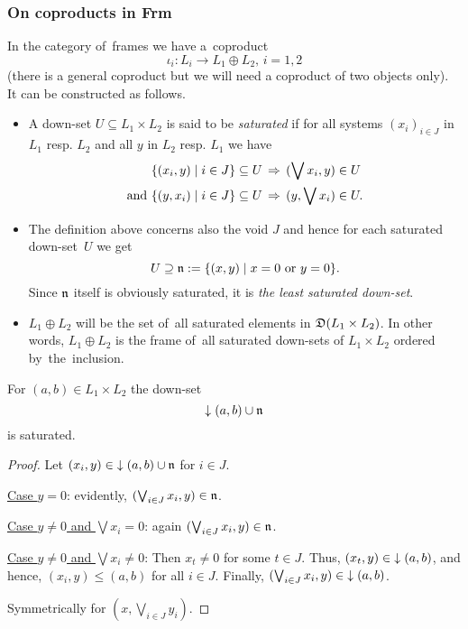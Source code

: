 \subsubsection*{On coproducts in Frm}

In the category of~frames we have a~coproduct
\[
  \iota_i: L_i \to L_1 \oplus L_2, \, i = 1, 2
\]
(there is a general coproduct but we will need a coproduct of two objects
 only).
It can be constructed as follows.

\begin{itemize}
\item
{} \label{df:satur}
A down-set $U\subseteq L_1 \times L_2$ is said to be \emph{saturated\/} if for
all systems $(x_i)_{i\in J}$ in $L_1$ resp. $L_2$ and all $y$ in $L_2$ resp.
$L_1$ we have
\begin{align*}
    \{ (x_i, y) \mid i\in J \} \subseteq U \, &\Rightarrow \, (\bigvee x_i,
        y)\in U \\
    \text{and } \{ (y, x_i) \mid i\in J \} \subseteq U \, &\Rightarrow \, (y,
        \bigvee x_i)\in U.
  \end{align*}

\item The definition above concerns also the void $J$ and hence for each
saturated down-set~$U$ we get
\[
  U\supseteq \mathfrak{n} := \{ (x, y) \mid x = 0 \text{ or } y = 0 \}.
\]
Since $\mathfrak{n}$ itself is obviously saturated, it is \emph{the least saturated
down-set\/}.

\item $L_1 \oplus L_2$ will be the set of~all saturated elements in $\mathfrak{D}(L_1
\times L_2)$.
In other words, $L_1 \oplus L_2$ is the frame of~all saturated down-sets of
$L_1 \times L_2$ ordered by~the~inclusion.
\end{itemize}

\begin{prop}
For $(a, b)\in L_1 \times L_2$ the down-set
\[
  \left\downarrow\right. (a, b) \cup \mathfrak{n}
\]
is saturated.
\end{prop}
\begin{proof}
  Let $(x_i, y)\in \left\downarrow\right. (a, b) \cup \mathfrak{n}$ for $i\in J$.

  \underline{Case $y = 0$}:
  evidently, $(\bigvee_{i\in J} x_i, y) \in \mathfrak{n}$.

  \underline{Case $y \ne 0$ and $\bigvee x_i = 0$}:
  again $(\bigvee_{i\in J} x_i, y) \in \mathfrak{n}$.

  \underline{Case $y \ne 0$ and $\bigvee x_i \ne 0$}:
  Then $x_t \ne 0$ for some $t\in J$.
  Thus, $(x_t, y)\in \left\downarrow\right. (a, b)$, and hence, $(x_i, y) \le (a, b)$ for all
  $i\in J$.
  Finally, $(\bigvee_{i\in J} x_i, y) \in \left\downarrow\right. (a, b)$.

  Symmetrically for $(x, \bigvee_{i\in J} y_i)$.
\end{proof}

